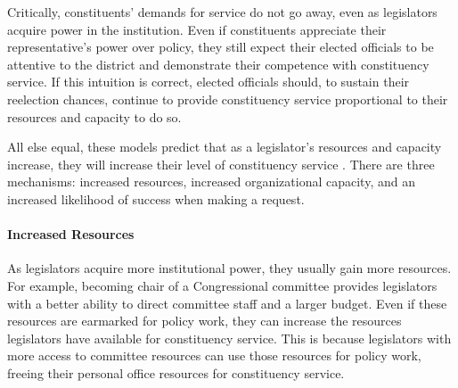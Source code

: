 \documentclass[12pt]{article}
\begin{document}
Critically, constituents' demands for service do not go away, even as legislators acquire power in the institution.  Even if constituents appreciate their representative's power over policy, they still expect their elected officials to be attentive to the district and demonstrate their competence with constituency service. If this intuition is correct, elected officials should, to sustain their reelection chances, continue to provide constituency service proportional to their resources and capacity to do so. %


All else equal, these models predict that as a legislator's resources and capacity increase, they will increase their level of constituency service \cite[Proposition 1]{AshworthBuenodeMesquita2006}. There are three mechanisms: increased resources, increased organizational capacity, and an increased likelihood of success when making a request. 

\paragraph{Increased Resources} As legislators acquire more institutional power, they usually gain more resources. For example, becoming chair of a Congressional committee provides legislators with a better ability to direct committee staff and a larger budget. Even if these resources are earmarked for policy work, they can increase the resources legislators have available for constituency service. This is because legislators with more access to committee resources can use those resources for policy work, freeing their personal office resources for constituency service. 
\end{document}
